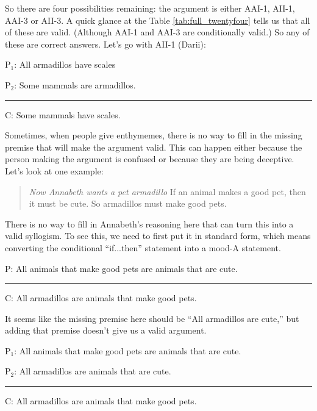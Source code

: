 {So there are four possibilities remaining: the argument is either AAI-1, AII-1, AAI-3 or AII-3. A quick glance at the Table \ref{tab:full_twentyfour} tells us that all of these are valid. (Although AAI-1 and AAI-3 are conditionally valid.) So any of these are correct answers. Let's go with AII-1 (Darii):


\begin{earg}
\item[P$_1$:] All armadillos have scales
\item[P$_2$:] Some mammals are armadillos.
\vspace{-.5em}
\item [] \rule{0.3\linewidth}{.5pt} 
\item[C:] Some mammals have scales. 
\end{earg}

Sometimes, when people give enthymemes, there is no way to fill in the missing premise that will make the argument valid. This can happen either because the person making the argument is confused or because they are being deceptive. Let's look at one example: 

\begin{quotation}\noindent\textit{Now Annabeth wants a pet armadillo} If an animal makes a good pet, then it must be cute. So armadillos must make good pets. \end{quotation}

There is no way to fill in Annabeth's reasoning here that can turn this into a valid syllogism. To see this, we need to first put it in standard form, which means converting the conditional ``if...then'' statement into a mood-A statement. 


\begin{earg}
\item[P:] All animals that make good pets are animals that are cute. 
\vspace{-.5em}
\item [] \rule{0.6\linewidth}{.5pt} 
\item[C:] All armadillos are animals that make good pets. 
\end{earg}

It seems like the missing premise here should be ``All armadillos are cute,''  but adding that premise doesn't give us a valid argument. 

\begin{earg}
\item[P$_1$:] All animals that make good pets are animals that are cute.
\item[P$_2$:] All armadillos are animals that are cute. 
\vspace{-.5em}
\item [] \rule{0.6\linewidth}{.5pt} 
\item[C:] All armadillos are animals that make good pets.   
\end{earg}

}
